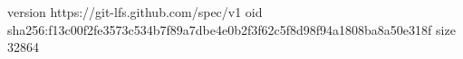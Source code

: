 version https://git-lfs.github.com/spec/v1
oid sha256:f13c00f2fe3573c534b7f89a7dbe4e0b2f3f62c5f8d98f94a1808ba8a50e318f
size 32864
